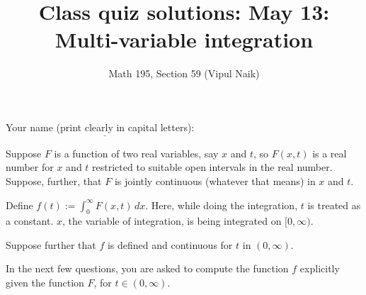 \documentclass[10pt]{amsart}
\title{Class quiz solutions: May 13: Multi-variable integration}
\author{Math 195, Section 59 (Vipul Naik)}
\begin{document}
\maketitle

Your name (print clearly in capital letters): $\underline{\qquad\qquad\qquad\qquad\qquad\qquad\qquad\qquad\qquad\qquad}$

Suppose $F$ is a function of two real variables, say $x$
and $t$, so $F(x,t)$ is a real number for $x$ and $t$ restricted to
suitable open intervals in the real number. Suppose, further, that $F$
is jointly continuous (whatever that means) in $x$ and $t$.

Define $f(t) := \int_0^\infty F(x,t) \, dx$. Here, while doing the
integration, $t$ is treated as a constant. $x$, the variable of
integration, is being integrated on $[0,\infty)$.
  
Suppose further that $f$ is defined and continuous for $t$ in
$(0,\infty)$.

In the next few questions, you are asked to compute the function $f$
explicitly given the function $F$, for $t \in (0,\infty)$.
\end{document}
